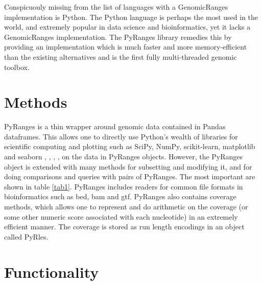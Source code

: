\documentclass[10pt,letterpaper]{article}
\begin{document}
Conspicuouly missing from the list of languages with a GenomicRanges
implementation is Python. The Python language is perhaps the most used in the
world, and extremely popular in data science and bioinformatics, yet it lacks a
GenomicRanges implementation. The PyRanges library remedies this by providing an
implementation which is much faster and more memory-efficient than the existing
alternatives and is the first fully multi-threaded genomic toolbox.

\section*{Methods}



PyRanges is a thin wrapper around genomic data contained in Pandas
\cite{mckinney-proc-scipy-2010} dataframes. This allows one to directly use
Python's wealth of libraries for scientific computing and plotting such as
SciPy, NumPy, scikit-learn, matplotlib and seaborn \cite{scipy},
\cite{oliphant-2006-guide}, \cite{scikit-learn}, \cite{Hunter:2007},
\cite{michael_waskom_2017_883859} on the data in PyRanges objects. However, the
PyRanges object is extended with many methods for subsetting and modifying it,
and for doing comparisons and queries with pairs of PyRanges. The most important
are shown in table \ref{tab1}. PyRanges includes readers for common file formats
in bioinformatics such as bed, bam and gtf. PyRanges also contains coverage
methods, which allows one to represent and do arithmetic on the coverage (or
some other numeric score associated with each nucleotide) in an extremely
efficient manner. The coverage is stored as run length encodings in an object
called PyRles.

\section*{Functionality}

\end{document}
